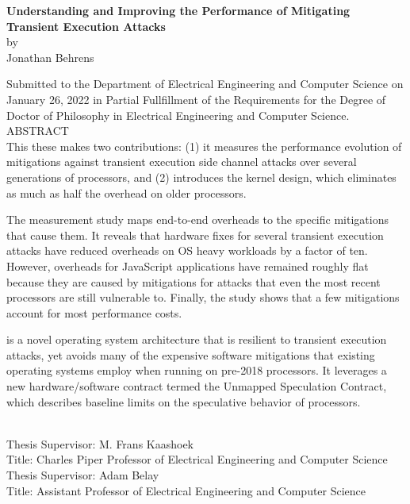 
\singlespace
\begin{center}

{\large \bf Understanding and Improving the Performance of Mitigating Transient Execution Attacks} \\[.5\baselineskip]
by \\
Jonathan Behrens \\[.5\baselineskip]
\end{center}

Submitted to the Department of Electrical Engineering and Computer Science on January 26, 2022 in Partial Fullfillment of the Requirements for the Degree of Doctor of Philosophy in Electrical Engineering and Computer Science.\\[.5\baselineskip]

\noindent
ABSTRACT \\

This these makes two contributions:
(1) it measures the performance evolution of mitigations against transient execution side channel attacks over several generations of processors, and (2) introduces the \sys kernel design, which eliminates as much as half the overhead on older processors.

The measurement study maps end-to-end overheads to the specific mitigations that cause them.
It reveals that hardware fixes for several transient execution attacks have reduced overheads on OS heavy workloads by a factor of ten.
However, overheads for JavaScript applications have remained roughly flat because they are caused by mitigations for attacks that even the most recent processors are still vulnerable to.
Finally, the study shows that a few mitigations account for most performance costs.


\sys is a novel operating system architecture that is resilient to transient execution attacks, yet avoids many of the expensive software mitigations that existing operating systems employ when running on pre-2018 processors.
It leverages a new hardware/software contract termed the Unmapped Speculation Contract, which describes baseline limits on the speculative behavior of processors.

~\\[\baselineskip]

\noindent
Thesis  Supervisor:  M.  Frans  Kaashoek \\
Title:  Charles  Piper  Professor  of Electrical  Engineering  and  Computer  Science \\[.5\baselineskip]
\noindent
Thesis  Supervisor:  Adam Belay \\
Title:  Assistant Professor  of Electrical  Engineering  and  Computer  Science \\

\doublespace